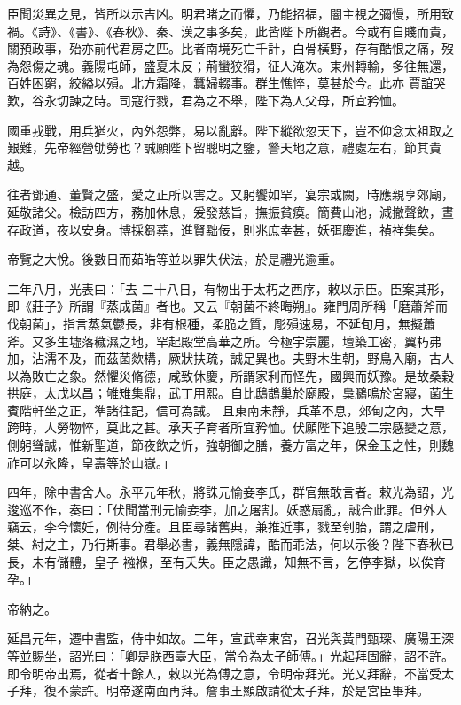 \begin{pinyinscope}
 臣聞災異之見，皆所以示吉凶。明君睹之而懼，乃能招福，闇主視之彌慢，所用致禍。《詩》、《書》、《春秋》、秦、漢之事多矣，此皆陛下所觀者。今或有自賤而貴，關預政事，殆亦前代君房之匹。比者南境死亡千計，白骨橫野，存有酷恨之痛，歿為怨傷之魂。義陽屯師，盛夏未反；荊蠻狡猾，征人淹次。東州轉輸，多往無還，百姓困窮，絞縊以殞。北方霜降，蠶婦輟事。群生憔悴，莫甚於今。此亦
 賈誼哭歎，谷永切諫之時。司寇行戮，君為之不舉，陛下為人父母，所宜矜恤。



 國重戎戰，用兵猶火，內外怨弊，易以亂離。陛下縱欲忽天下，豈不仰念太祖取之艱難，先帝經營劬勞也？誠願陛下留聰明之鑒，警天地之意，禮處左右，節其貴越。



 往者鄧通、董賢之盛，愛之正所以害之。又躬饗如罕，宴宗或闕，時應親享郊廟，延敬諸父。檢訪四方，務加休息，爰發慈旨，撫振貧瘼。簡費山池，減撤聲飲，晝存政道，夜以安身。博採芻蕘，進賢黜佞，則兆庶幸甚，妖弭慶進，禎祥集矣。



 帝覽之大悅。後數日而茹皓等並以罪失伏法，於是禮光逾重。



 二年八月，光表曰：「去
 二十八日，有物出于太朽之西序，敕以示臣。臣案其形，即《莊子》所謂『蒸成菌』者也。又云『朝菌不終晦朔』。雍門周所稱「磨蕭斧而伐朝菌」，指言蒸氣鬱長，非有根種，柔脆之質，彫殞速易，不延旬月，無擬蕭斧。又多生墟落穢濕之地，罕起殿堂高華之所。今極宇崇麗，壇築工密，翼朽弗加，沾濡不及，而茲菌欻構，厥狀扶疏，誠足異也。夫野木生朝，野鳥入廟，古人以為敗亡之象。然懼災脩德，咸致休慶，所謂家利而怪先，國興而妖豫。是故桑穀拱庭，太戊以昌；雊雉集鼎，武丁用熙。自比鴟鵲巢於廟殿，梟鵩鳴於宮寢，菌生賓階軒坐之正，準諸往記，信可為誡。
 且東南未靜，兵革不息，郊甸之內，大旱跨時，人勞物悴，莫此之甚。承天子育者所宜矜恤。伏願陛下追殷二宗感變之意，側躬聳誠，惟新聖道，節夜飲之忻，強朝御之膳，養方富之年，保金玉之性，則魏祚可以永隆，皇壽等於山嶽。」



 四年，除中書舍人。永平元年秋，將誅元愉妾李氏，群官無敢言者。敕光為詔，光逡巡不作，奏曰：「伏聞當刑元愉妾李，加之屠割。妖惑扇亂，誠合此罪。但外人竊云，李今懷妊，例待分產。且臣尋諸舊典，兼推近事，戮至刳胎，謂之虐刑，桀、紂之主，乃行斯事。君舉必書，義無隱諱，酷而乖法，何以示後？陛下春秋已長，未有儲體，皇子
 襁褓，至有夭失。臣之愚識，知無不言，乞停李獄，以俟育孕。」



 帝納之。



 延昌元年，遷中書監，侍中如故。二年，宣武幸東宮，召光與黃門甄琛、廣陽王深等並賜坐，詔光曰：「卿是朕西臺大臣，當令為太子師傅。」光起拜固辭，詔不許。即令明帝出焉，從者十餘人，敕以光為傅之意，令明帝拜光。光又拜辭，不當受太子拜，復不蒙許。明帝遂南面再拜。詹事王顯啟請從太子拜，於是宮臣畢拜。




\end{pinyinscope}
